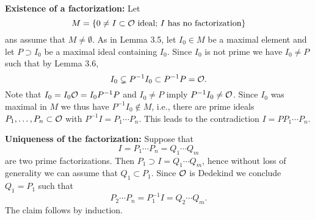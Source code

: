 \begin{Bew}[of Theorem 3.4]
	\textbf{Existence of a factorization:} Let
	\[ M = \left\{  0 \neq I \subset \mathcal{O} \text{ ideal; $I$ has no factorization} \right\}
	\]
	ans assume that $M\neq \emptyset$. As in Lemma 3.5, let $I_0 \in M$ be a maximal element and let $P \supset I_0$ be a maximal ideal containing $I_0$.
	Since $I_0$ is not prime we have $I_0 \neq P$ such that by Lemma 3.6,
	\[ I_0 \subsetneq P^{-1} I_0 \subset P^{-1} P = \mathcal{O}.
	\]
	Note that $I_0 = I_0 \mathcal{O} = I_0 P^{-1} P$ and $I_0 \neq P$ imply $P^{-1}I_0 \neq \mathcal{O}$.
	Since $I_0$ was maximal in $M$ we thus have $P^{-1}I_0 \not \in M$, i.e., there are prime ideals $P_1, \dots, P_n \subset \mathcal{O}$ with $P^{-1} I = P_1 \cdots P_n$.
	This leads to the contradiction $I=PP_1 \cdots P_n$.
	
	\bigskip \textbf{Uniqueness of the factorization:} Suppose that
	\[ I=P_1 \cdots P_n =Q_1 \cdots Q_m
	\]
	are two prime factorizations. Then $P_1 \supset I =Q_1 \cdots Q_m$, hence without loss of generality we can assume that $Q_1 \subset P_1$. Since $\mathcal{O}$ is Dedekind we conclude $Q_1 = P_1$ such that 
	\[ P_2 \cdots P_n = P_1^{-1} I = Q_2 \cdots Q_m.
	\]
	The claim follows by induction.
\end{Bew}


































